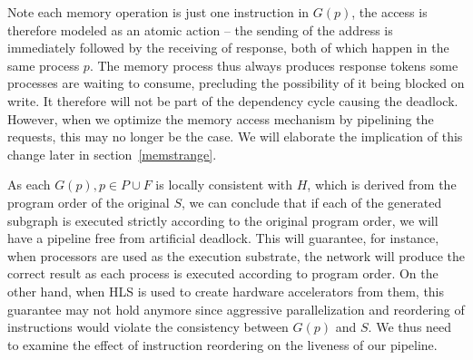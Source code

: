 Note each memory operation is just one instruction in $G(p)$, the
access is therefore modeled as an atomic action -- the sending of the address is immediately followed by the receiving of response, both of which happen in the same process $p$.
The memory process thus always produces response tokens some processes are waiting to consume, precluding the possibility of it being blocked on write. %
It therefore will not be part of the dependency cycle causing the deadlock.
However, when we optimize the memory access mechanism by pipelining the requests, this may no longer be the case. 
We will elaborate the implication of this change later in section~\ref{memstrange}.



As each $G(p), p \in P \cup F$ is locally consistent with $H$, which is derived from
the program order of the original $S$, we can conclude that if each of
the generated subgraph is executed strictly according to the original
program order, we will have a pipeline free from artificial deadlock. This
will guarantee, for instance, when processors are used as the execution substrate, the network will produce the correct result as
each process is executed according to program order. On the other hand, when
HLS is used to create hardware accelerators from them, this guarantee may not
hold anymore since aggressive parallelization and reordering of instructions
would violate the consistency between $G(p)$ and $S$. We thus need to examine
the  effect of instruction reordering on the liveness of our pipeline.



